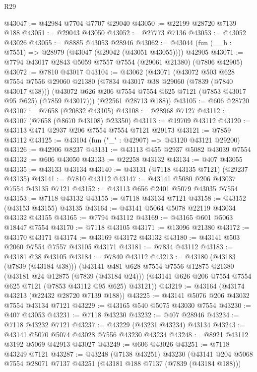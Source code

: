 \begin{lexlean}{R29}
\begin{coremodule}
@43047 := @42984 @7704 @7707 @29040
@43050 := @22199 @28720 @7139 @188
@43051 := @29043 @43050
@43052 := @27773 @7136
@43053 := @43052 @43026
@43055 := @8885 @43053 @28946
@43062 := @43044 (fun (__b : @7551) => @28979 (@43047 (@29042 (@43051 @43055)))) @42905
@43071 := @7794 @43017 @2843 @5059 @7557 @7554 (@29061 @21380) (@7806 @42905)
@43072 := @7810 @43017
@43104 := @43062
    (@43071
      (@43072
        @503
        @628
        @7554
        @7556
        @29060
        @21380
        (@7834 @43017 @38 @29060 (@7839 (@7840 @43017 @38)))
        (@43072 @626 @206 @7554 @7554 @625 @7121 (@7853 @43017 @95 @625) (@7859 @43017)))
      (@22561 @28713 @188))
@43105 := @606 @28720
@43107 := @7658 (@20832 @43105)
@43108 := @28968 @7127
@43112 := @43107 (@7658 (@8670 @43108) @23350)
@43113 := @19709 @43112
@43120 := @43113 @471 @2937 @206 @7554 @7554 @7121 @29173
@43121 := @7859 @43112
@43125 := @43104 (fun ("_" : @42907) => @43120 @43121 @29200)
@43126 := @42906 @8237
@43131 := @43113 @455 @2937 @5082 @43039 @7554
@43132 := @606 @43050
@43133 := @22258 @43132
@43134 := @407 @43055
@43135 := @43133 @43134
@43140 := @43131 (@7118 @43135 @7121) (@29237 @43135)
@43141 := @7810 @43112
@43147 := @43141 @5080 @206 @43037 @7554 @43135 @7121
@43152 := @43113 @656 @2401 @5079 @43035 @7554
@43153 := @7118 @43132
@43155 := @7118 @43134 @7121
@43158 := @43152 (@43153 @43155) @43135
@43164 := @43141 @5064 @5078 @22119 @43034 @43132 @43155
@43165 := @7794 @43112
@43169 := @43165 @601 @5063 @18447 @7554
@43170 := @7118 @43105
@43171 := @13096 @21380
@43172 := @43170 @43171
@43174 := @43169 @43172 @43132
@43180 := @43141 @503 @2060 @7554 @7557 @43105 @43171
@43181 := @7834 @43112
@43183 := @43181 @38 @43105
@43184 := @7840 @43112
@43213 := @43180
    (@43183 (@7839 (@43184 @38)))
    (@43141
      @481
      @628
      @7554
      @7556
      @12875
      @21380
      (@43181 @24 @12875 (@7839 (@43184 @24)))
      (@43141 @626 @206 @7554 @7554 @625 @7121 (@7853 @43112 @95 @625) @43121))
@43219 := @43164 (@43174 @43213 (@22432 @28720 @7139 @188))
@43225 := @43141 @5076 @206 @43032 @7554 @43134 @7121
@43229 := @43165 @540 @5075 @43030 @7554
@43230 := @407 @43053
@43231 := @7118 @43230
@43232 := @407 @28946
@43234 := @7118 @43232 @7121
@43237 := @43229 (@43231 @43234) @43134
@43243 := @43141 @5070 @5074 @43028 @7556 @43230 @43234
@43248 := @8921 @43112 @3192 @5069 @42913 @43027
@43249 := @606 @43026
@43251 := @7118 @43249 @7121
@43287 := @43248
    (@7138 @43251)
    @43230
    (@43141
      @204
      @5068
      @7554
      @28071
      @7137
      @43251
      (@43181 @188 @7137 (@7839 (@43184 @188)))

\end{coremodule}
\end{lexlean}
